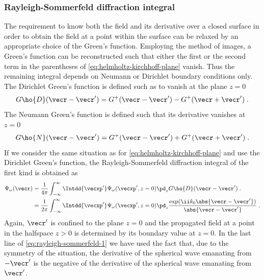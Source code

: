 \documentclass[
twoside,
openright,
titlepage,
numbers=noenddot,
headinclude,
fleqn,
a4paper,
footinclude=true,
cleardoublepage=empty,
abstractoff,
BCOR=5mm,
paper=a4,
fontsize=11pt,
british,ngerman,american,
]{scrreprt}
\begin{document}
\subsubsection{Rayleigh-Sommerfeld diffraction integral}
\label{sec:Rayleigh-Sommerfeld}

The requirement to know both the field and its derivative over a
closed surface in order to obtain the field at a point within the
surface can be relaxed by an appropriate choice of the Green's
function.  Employing the method of images, a Green's function can be
reconstructed such that either the first or the second term in the
parentheses of \cref{eq:helmholtz-kirchhoff-plane} vanish.  Thus the
remaining integral depends on Neumann or Dirichlet boundary conditions
only.  The Dirichlet Green's function is defined such as to vanish at
the plane $z=0$
\begin{equation}
  \label{eq:dirichlet-greens-function}
  G\ho{D}(\vecr-\vecr') = G^+(\vecr-\vecr') - G^+(\vecr+\vecr') \;.
\end{equation}
The Neumann Green's function is defined such that its derivative
vanishes at $z=0$
\begin{equation}
  \label{eq:neumann-greens-function}
  G\ho{N}(\vecr-\vecr') = G^+(\vecr-\vecr') + G^+(\vecr+\vecr') \;.
\end{equation}
If we consider the same situation as for
\cref{eq:helmholtz-kirchhoff-plane} and use the Dirichlet Green's
function, the Rayleigh-Sommerfeld diffraction integral of the first
kind is obtained as
\begin{equation}
  \label{eq:rayleigh-sommerfeld-1}
  \begin{split}
      \Psi_\omega(\vecr) 
      &= \frac{1}{4\pi}\int_{-\infty}^{\infty}\Intdd{\vecxp'}
      \Psi_\omega(\vecxp',z=0) \pd_z G\ho{D}(\vecr-\vecr')\;.
      \\ &= \frac{1}{2\pi}\int_{-\infty}^{\infty}\Intdd{\vecxp'}
      \Psi_\omega(\vecxp',z=0) 
      \pd_z\frac{\exp(\ii k_0\abs{\vecr-\vecr'})}
      {\abs{\vecr-\vecr'}} \;.
  \end{split}
\end{equation}
Again, $\vecr'$ is confined to the plane $z=0$ and the propagated
field at a point in the half\hyph space $z>0$ is determined by its
boundary value at $z=0$.  In the last line of
\cref{eq:rayleigh-sommerfeld-1} we have used the fact that, due to the
symmetry of the situation, the derivative of the spherical wave
emanating from $-\vecr'$ is the negative of the derivative of the
spherical wave emanating from $\vecr'$.
\end{document}
